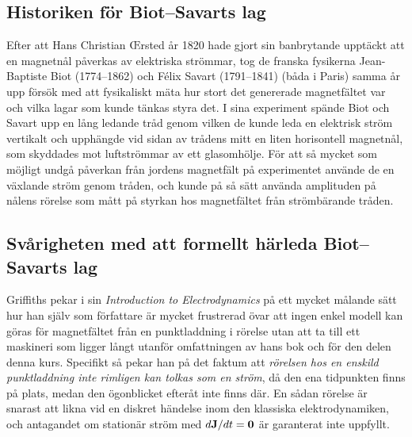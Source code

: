 {\subsection{Historiken f{\"o}r Biot--Savarts lag}
Efter att Hans Christian {\OE}rsted {\aa}r 1820 hade gjort sin banbrytande
uppt{\"a}ckt att en magnetn{\aa}l p{\aa}verkas av elektriska str{\"o}mmar, tog
de franska fysikerna Jean-Baptiste Biot (1774--1862)  och F\'elix Savart (1791--1841)  (b{\aa}da i Paris) samma {\aa}r upp f{\"o}rs{\"o}k med att
fysikaliskt m{\"a}ta hur stort det genererade magnetf{\"a}ltet var och vilka
lagar som kunde t{\"a}nkas styra det.
I sina experiment sp{\"a}nde Biot och Savart upp en l{\aa}ng ledande tr{\aa}d
genom vilken de kunde leda en elektrisk str{\"o}m vertikalt och upph{\"a}ngde
vid sidan av tr{\aa}dens mitt en liten horisontell magnetn{\aa}l, som skyddades
mot luftstr{\"o}mmar av ett glasomh{\"o}lje.
F{\"o}r att s{\aa} mycket som m{\"o}jligt undg{\aa} p{\aa}verkan fr{\aa}n
jordens magnetf{\"a}lt p{\aa} experimentet anv{\"a}nde de en v{\"a}xlande
str{\"o}m genom tr{\aa}den, och kunde p{\aa} s{\aa} s{\"a}tt anv{\"a}nda
amplituden p{\aa} n{\aa}lens r{\"o}relse som m{\aa}tt p{\aa} styrkan hos
magnetf{\"a}ltet fr{\aa}n str{\"o}mb{\"a}rande tr{\aa}den.

\subsection{Sv{\aa}righeten med att formellt h{\"a}rleda Biot--Savarts lag}
Griffiths pekar i sin {\it Introduction to Electrodynamics} p{\aa} ett mycket
m{\aa}lande s{\"a}tt hur han sj{\"a}lv som f{\"o}rfattare {\"a}r mycket
frustrerad {\"o}var att ingen enkel modell kan g{\"o}ras f{\"o}r
magnetf{\"a}ltet fr{\aa}n en punktladdning i r{\"o}relse utan att ta till ett
maskineri som ligger l{\aa}ngt utanf{\"o}r omfattningen av hans bok och f{\"o}r
den delen denna kurs.
Specifikt s{\aa} pekar han p{\aa} det faktum att {\it r{\"o}relsen hos en
enskild punktladdning inte rimligen kan tolkas som en str{\"o}m}, d{\aa} den
ena tidpunkten finns p{\aa} plats, medan den {\"o}gonblicket efter{\aa}t inte
finns d{\"a}r.
En s{\aa}dan r{\"o}relse {\"a}r snarast att likna vid en diskret h{\"a}ndelse
inom den klassiska elektrodynamiken, och antagandet om station{\"a}r str{\"o}m
med $d{\bf J}/dt={\bf 0}$ {\"a}r garanterat inte uppfyllt.

}
